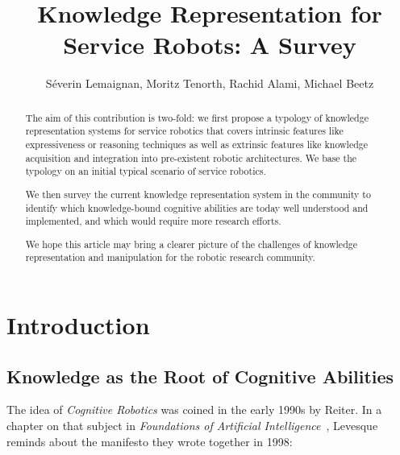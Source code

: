 \documentclass{IEEEtran}
\title{Knowledge Representation for Service Robots: A Survey}
\author{Séverin Lemaignan, Moritz Tenorth, Rachid Alami, Michael Beetz}
\begin{document}
\maketitle


\begin{abstract}

The aim of this contribution is two-fold: we first propose a typology of
knowledge representation systems for service robotics that covers intrinsic
features like expressiveness or reasoning techniques as well as extrinsic
features like knowledge acquisition and integration into pre-existent robotic
architectures. We base the typology on an initial typical scenario of service
robotics.

We then survey the current knowledge representation system in the community to
identify which knowledge-bound cognitive abilities are today well understood
and implemented, and which would require more research efforts.

We hope this article may bring a clearer picture of the challenges of knowledge
representation and manipulation for the robotic research community.

\end{abstract}



\section{Introduction}
\label{sect|intro}

\subsection{Knowledge as the Root of Cognitive Abilities}
\label{sect|cognitive-abilities}

The idea of \emph{Cognitive Robotics} was coined in the early 1990s by Reiter.
In a chapter on that subject in \emph{Foundations of Artificial
Intelligence}~\cite{Levesque2008}, Levesque reminds about the manifesto they
wrote together in 1998:
\end{document}
